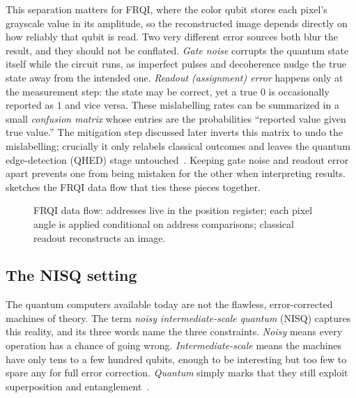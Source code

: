 This separation matters for FRQI, where the color qubit stores each pixel's grayscale value in its amplitude, so the reconstructed image depends directly on how reliably that qubit is read. Two very different error sources both blur the result, and they should not be conflated. \emph{Gate noise} corrupts the quantum state itself while the circuit runs, as imperfect pulses and decoherence nudge the true state away from the intended one. \emph{Readout (assignment) error} happens only at the measurement step: the state may be correct, yet a true $0$ is occasionally reported as $1$ and vice versa. These mislabelling rates can be summarized in a small \emph{confusion matrix} whose entries are the probabilities ``reported value given true value.'' The mitigation step discussed later inverts this matrix to undo the mislabelling; crucially it only relabels classical outcomes and leaves the quantum edge-detection (QHED) stage untouched~\cite{Mu2025GuidedImageFiltering}. Keeping gate noise and readout error apart prevents one from being mistaken for the other when interpreting results.  sketches the FRQI data flow that ties these pieces together.

\begin{figure}[htbp]
\centering
{}
\caption{FRQI data flow: addresses live in the position register; each pixel angle is applied conditional on address comparisons; classical readout reconstructs an image.}
\label{fig:frqi-flow}
\end{figure}

\subsection{The NISQ setting}
The quantum computers available today are not the flawless, error-corrected machines of theory. The term \emph{noisy intermediate-scale quantum} (NISQ) captures this reality, and its three words name the three constraints. \emph{Noisy} means every operation has a chance of going wrong. \emph{Intermediate-scale} means the machines have only tens to a few hundred qubits, enough to be interesting but too few to spare any for full error correction. \emph{Quantum} simply marks that they still exploit superposition and entanglement~\cite{Preskill2018NISQ,Geng2022HybridNISQEdge}.

